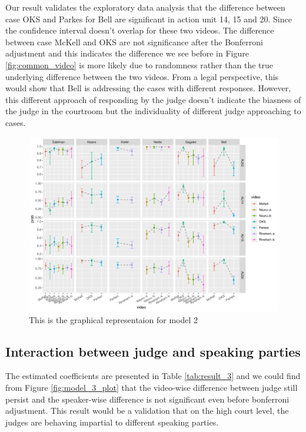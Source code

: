 \documentclass{monashthesis}
\begin{document}
Our result validates the exploratory data analysis that the difference between case OKS and Parkes for Bell are significant in action unit 14, 15 and 20. Since the confidence interval doesn't overlap for these two videos. The difference between case McKell and OKS are not significance after the Bonferroni adjustment and this indicates the difference we see before in Figure \ref{fig:common_video} is more likely due to randomness rather than the true underlying difference between the two videos. From a legal perspective, this would show that Bell is addressing the cases with different responses. However, this different approach of responding by the judge doesn't indicate the biasness of the judge in the courtroom but the individuality of different judge approaching to cases.

\begin{figure}

{\centering \includegraphics[width=1\linewidth]{figures/unnamed-chunk-11-1} 

}

\caption{This is the graphical representaion for model 2\label{fig:model_2_plot}}\label{fig:unnamed-chunk-11}
\end{figure}

\hypertarget{interaction-between-judge-and-speaking-parties}{%
\subsection{Interaction between judge and speaking parties}\label{interaction-between-judge-and-speaking-parties}}

The estimated coefficients are presented in Table \ref{tab:result_3} and we could find from Figure \ref{fig:model_3_plot} that the video-wise difference between judge still persist and the speaker-wise difference is not significant even before bonferroni adjustment. This result would be a validation that on the high court level, the judges are behaving impartial to different speaking parties.
\end{document}
